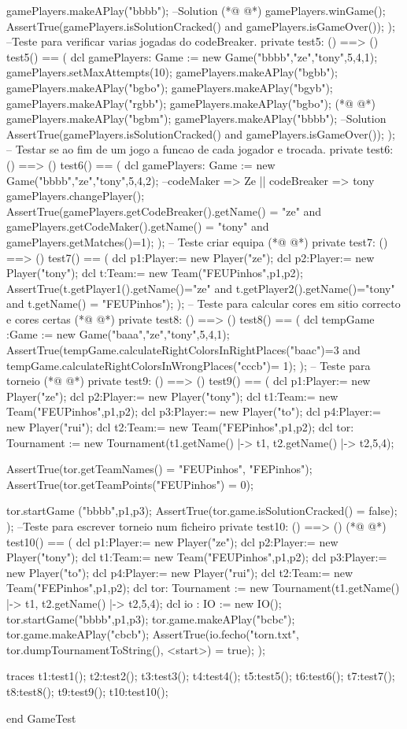 \begin{vdmpp}[breaklines=true]
  gamePlayers.makeAPlay("bbbb"); --Solution
(*@
\label{test5:65}
@*)
  gamePlayers.winGame();
  AssertTrue(gamePlayers.isSolutionCracked() and gamePlayers.isGameOver());
  );
  --Teste para verificar varias jogadas do codeBreaker.
  private test5: () ==> ()
  test5() ==
  ( 
  dcl gamePlayers: Game := new Game("bbbb","ze","tony",5,4,1);
  gamePlayers.setMaxAttempts(10); 
  gamePlayers.makeAPlay("bgbb");
  gamePlayers.makeAPlay("bgbo");
  gamePlayers.makeAPlay("bgyb");
  gamePlayers.makeAPlay("rgbb");
  gamePlayers.makeAPlay("bgbo");
(*@
\label{test6:79}
@*)
  gamePlayers.makeAPlay("bgbm");
  gamePlayers.makeAPlay("bbbb"); --Solution
  AssertTrue(gamePlayers.isSolutionCracked() and gamePlayers.isGameOver());
  );
  -- Testar se ao fim de um jogo a funcao de cada jogador e trocada.
  private test6: () ==> ()
  test6() ==
  ( 
  dcl gamePlayers: Game := new Game("bbbb","ze","tony",5,4,2); 
  --codeMaker => Ze || codeBreaker => tony
  gamePlayers.changePlayer();
  AssertTrue(gamePlayers.getCodeBreaker().getName() = "ze" and gamePlayers.getCodeMaker().getName() = "tony" and gamePlayers.getMatches()=1);
  );
  -- Teste criar equipa
(*@
\label{test7:93}
@*)
  private test7: () ==> ()
  test7() ==
  ( 
    dcl p1:Player:= new Player("ze");
   dcl p2:Player:= new Player("tony");
   dcl t:Team:= new Team("FEUPinhos",p1,p2);  
  AssertTrue(t.getPlayer1().getName()="ze" and t.getPlayer2().getName()="tony" and t.getName() = "FEUPinhos");
  );
  -- Teste para calcular cores em sitio correcto e cores certas 
(*@
\label{test8:102}
@*)
  private test8: () ==> ()
  test8() ==
  ( 
  dcl tempGame :Game := new Game("baaa","ze","tony",5,4,1);
  AssertTrue(tempGame.calculateRightColorsInRightPlaces("baac")=3 and tempGame.calculateRightColorsInWrongPlaces("cccb")= 1);
  );
  -- Teste para torneio
(*@
\label{test9:109}
@*)
  private test9: () ==> ()
  test9() ==
  ( 
   dcl p1:Player:= new Player("ze");
   dcl p2:Player:= new Player("tony");
   dcl t1:Team:= new Team("FEUPinhos",p1,p2);
   dcl p3:Player:= new Player("to");
   dcl p4:Player:= new Player("rui");
   dcl t2:Team:= new Team("FEPinhos",p1,p2);
   dcl tor: Tournament := new Tournament({t1.getName() |-> t1, t2.getName() |-> t2},5,4);
   
   AssertTrue(tor.getTeamNames() = {"FEUPinhos", "FEPinhos"});
   AssertTrue(tor.getTeamPoints("FEUPinhos") = 0);
   
   tor.startGame ("bbbb",p1,p3);
   AssertTrue(tor.game.isSolutionCracked() = false);
  );
  --Teste para escrever torneio num ficheiro
  private test10: () ==> ()
(*@
\label{test10:128}
@*)
  test10() ==
  ( 
   dcl p1:Player:= new Player("ze");
   dcl p2:Player:= new Player("tony");
   dcl t1:Team:= new Team("FEUPinhos",p1,p2);
   dcl p3:Player:= new Player("to");
   dcl p4:Player:= new Player("rui");
   dcl t2:Team:= new Team("FEPinhos",p1,p2);
   dcl tor: Tournament := new Tournament({t1.getName() |-> t1, t2.getName() |-> t2},5,4);
   dcl io : IO := new IO();
   tor.startGame("bbbb",p1,p3);
   tor.game.makeAPlay("bcbc");
   tor.game.makeAPlay("cbcb");
   AssertTrue(io.fecho("torn.txt", tor.dumpTournamentToString(), <start>) = true);
  );
  
 traces 
  t1:test1();  
   t2:test2();
   t3:test3(); 
   t4:test4();          
   t5:test5();
   t6:test6();
   t7:test7();
   t8:test8();
   t9:test9();
   t10:test10();
            
end GameTest
\end{vdmpp}
